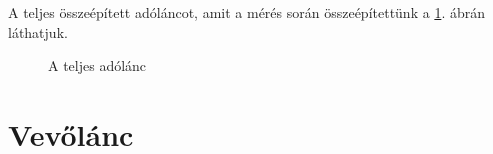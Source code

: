 A teljes összeépített adóláncot, amit a mérés során összeépítettünk a \ref{fig:adolanc}. ábrán láthatjuk.

\begin{figure}[H]
	\centering
	\caption{A teljes adólánc}
	\label{fig:adolanc}
\end{figure}

\section*{Vevőlánc}




































